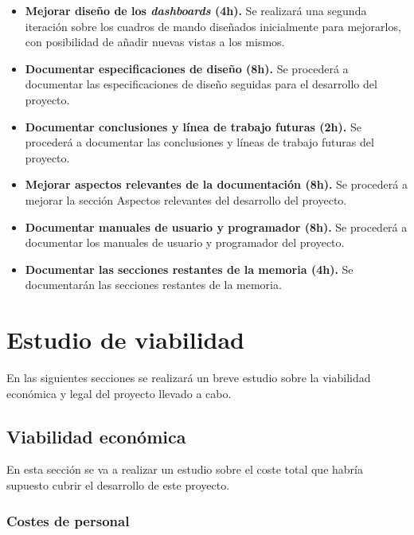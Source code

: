 \begin{itemize}
    \item \textbf{Mejorar diseño de los \textit{dashboards} (4h).} Se realizará una segunda iteración sobre los cuadros de mando diseñados inicialmente para mejorarlos, con posibilidad de añadir nuevas vistas a los mismos.

    \item \textbf{Documentar especificaciones de diseño (8h).} Se procederá a documentar las especificaciones de diseño seguidas para el desarrollo del proyecto.

    \item \textbf{Documentar conclusiones y línea de trabajo futuras (2h).} Se procederá a documentar las conclusiones y líneas de trabajo futuras del proyecto.

    \item \textbf{Mejorar aspectos relevantes de la documentación (8h).} Se procederá a mejorar la sección Aspectos relevantes del desarrollo del proyecto.

    \item \textbf{Documentar manuales de usuario y programador (8h).} Se procederá a documentar los manuales de usuario y programador del proyecto.
    
    \item \textbf{Documentar las secciones restantes de la memoria (4h).} Se documentarán las secciones restantes de la memoria.
    

\end{itemize}




\section{Estudio de viabilidad}

En las siguientes secciones se realizará un breve estudio sobre la viabilidad económica y legal del proyecto llevado a cabo.

\subsection{Viabilidad económica}

En esta sección se va a realizar un estudio sobre el coste total que habría supuesto cubrir el desarrollo de este proyecto.

\subsubsection{Costes de personal}


